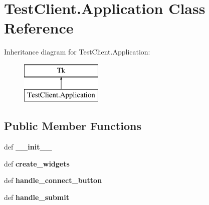 \hypertarget{class_test_client_1_1_application}{\section{Test\+Client.\+Application Class Reference}
\label{class_test_client_1_1_application}
}
Inheritance diagram for Test\+Client.\+Application\+:\begin{figure}[H]
\begin{center}
\leavevmode
\includegraphics[height=2.000000cm]{class_test_client_1_1_application}
\end{center}
\end{figure}
\subsection*{Public Member Functions}
\begin{DoxyCompactItemize}
\item 
\hypertarget{class_test_client_1_1_application_a704fa6d313f87507dc3f9814858f33a0}{def {\bfseries \+\_\+\+\_\+init\+\_\+\+\_\+}}\label{class_test_client_1_1_application_a704fa6d313f87507dc3f9814858f33a0}

\item 
\hypertarget{class_test_client_1_1_application_afce40e9472ca633c7816c9a9130d785e}{def {\bfseries create\+\_\+widgets}}\label{class_test_client_1_1_application_afce40e9472ca633c7816c9a9130d785e}

\item 
\hypertarget{class_test_client_1_1_application_a8b86648fd065c84934892995e936597a}{def {\bfseries handle\+\_\+connect\+\_\+button}}\label{class_test_client_1_1_application_a8b86648fd065c84934892995e936597a}

\item 
\hypertarget{class_test_client_1_1_application_aa9a6e8f0ecb6cebcf79f8d0b77110c29}{def {\bfseries handle\+\_\+submit}}\label{class_test_client_1_1_application_aa9a6e8f0ecb6cebcf79f8d0b77110c29}

\end{DoxyCompactItemize}
